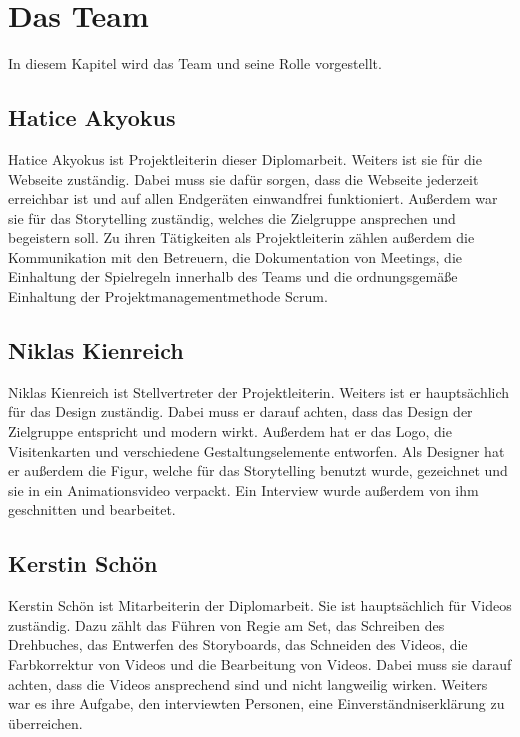 \chapter{Das Team}
In diesem Kapitel wird das Team und seine Rolle vorgestellt.
 
\section{Hatice Akyokus}

Hatice Akyokus ist Projektleiterin dieser Diplomarbeit. Weiters ist sie für die Webseite zuständig. Dabei muss sie dafür sorgen, dass die Webseite jederzeit erreichbar ist und auf allen Endgeräten einwandfrei funktioniert. Außerdem war sie für das Storytelling zuständig, welches die Zielgruppe ansprechen und begeistern soll. Zu ihren Tätigkeiten als Projektleiterin zählen außerdem die Kommunikation mit den Betreuern, die Dokumentation von Meetings, die Einhaltung der Spielregeln innerhalb des Teams und die ordnungsgemäße Einhaltung der Projektmanagementmethode Scrum.

\section{Niklas Kienreich}
Niklas Kienreich ist Stellvertreter der Projektleiterin. Weiters ist er hauptsächlich für das Design zuständig. Dabei muss er darauf achten, dass das Design der Zielgruppe entspricht und modern wirkt. Außerdem hat er das Logo, die Visitenkarten und verschiedene Gestaltungselemente entworfen. Als Designer hat er außerdem die Figur, welche für das Storytelling benutzt wurde, gezeichnet und sie in ein Animationsvideo verpackt. Ein Interview wurde außerdem von ihm geschnitten und bearbeitet.

\section{Kerstin Schön}
Kerstin Schön ist Mitarbeiterin der Diplomarbeit. Sie ist hauptsächlich für Videos zuständig. Dazu zählt das Führen von Regie am Set, das Schreiben des Drehbuches, das Entwerfen des Storyboards, das Schneiden des Videos, die Farbkorrektur von Videos und die Bearbeitung von Videos. Dabei muss sie darauf achten, dass die Videos ansprechend sind und nicht langweilig wirken. Weiters war es ihre Aufgabe, den interviewten Personen, eine Einverständniserklärung zu überreichen.
 
